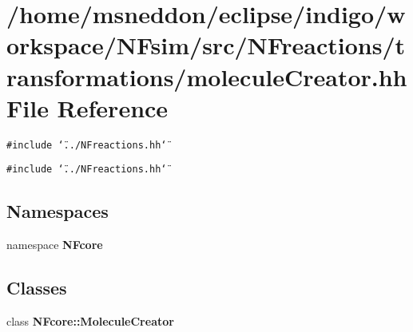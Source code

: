 \section{/home/msneddon/eclipse/indigo/workspace/NFsim/src/NFreactions/transformations/moleculeCreator.hh File Reference}
\label{moleculeCreator_8hh}


{\tt \#include \char`\"{}../NFreactions.hh\char`\"{}}\par
{\tt \#include \char`\"{}../NFreactions.hh\char`\"{}}\par
\subsection*{Namespaces}
\begin{CompactItemize}
\item 
namespace {\bf NFcore}
\end{CompactItemize}
\subsection*{Classes}
\begin{CompactItemize}
\item 
class {\bf NFcore::MoleculeCreator}
\end{CompactItemize}

